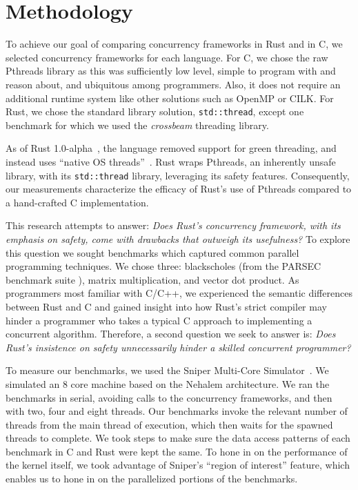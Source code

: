 \section{Methodology}\label{sec::methodology}

To achieve our goal of comparing concurrency frameworks in Rust and in C, we selected concurrency frameworks for each language. For C, we chose the raw Pthreads library as this was sufficiently low level, simple to program with and reason about, and ubiquitous among programmers. Also, it does not require an additional runtime system like other solutions such as OpenMP or CILK. For Rust, we chose the standard library solution, \texttt{std::thread}, except one benchmark for which we used the \textit{crossbeam} threading library.

As of Rust 1.0-alpha~\cite{rust-release}, the language removed support for green threading, and instead uses “native OS threads”~\cite{rust-doc}. Rust wraps Pthreads, an inherently unsafe library, with its \texttt{std::thread} library, leveraging its safety features. Consequently, our measurements characterize the efficacy of Rust's use of Pthreads compared to a hand-crafted C implementation.

This research attempts to answer: \textit{Does Rust's concurrency framework, with its emphasis on safety, come with drawbacks that outweigh its usefulness?} To explore this question we sought benchmarks which captured common parallel programming techniques. We chose three: blackscholes (from the PARSEC benchmark suite \cite{parsec}), matrix multiplication, and vector dot product. As programmers most familiar with C/C++, we experienced the semantic differences between Rust and C and gained insight into how Rust's strict compiler may hinder a programmer who takes a typical C approach to implementing a concurrent algorithm. Therefore, a second question we seek to answer is: \textit{Does Rust's insistence on safety unnecessarily hinder a skilled concurrent programmer?}

To measure our benchmarks, we used the Sniper Multi-Core Simulator~\cite{sniper}. We simulated an 8 core machine based on the Nehalem architecture. We ran the benchmarks in serial, avoiding calls to the concurrency frameworks, and then with two, four and eight threads. Our benchmarks invoke the relevant number of threads from the main thread of execution, which then waits for the spawned threads to complete. We took steps to make sure the data access patterns of each benchmark in C and Rust were kept the same. To hone in on the performance of the kernel itself, we took advantage of Sniper's ``region of interest'' feature, which enables us to hone in on the parallelized portions of the benchmarks.

